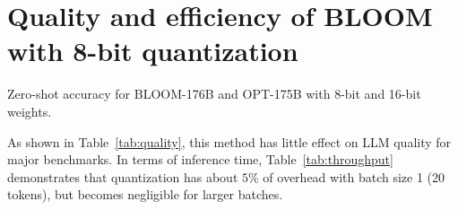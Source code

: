 \section{Quality and efficiency of BLOOM with 8-bit quantization}\label{appendix:8bit_quality}

\begin{table}[b]
\begin{minipage}{0.56\textwidth}
\centering
\caption{Zero-shot accuracy for \mbox{BLOOM-176B} and \mbox{OPT-175B} with 8-bit and 16-bit weights.\nocite{eval-harness}}
\vspace{9pt}
\label{tab:quality}
\end{minipage}
\hspace{4px}
\begin{minipage}{0.42\textwidth}
\centering
\caption{Generation throughput (tokens/s) for BLOOM-176B with 8-bit and 16-bit weights on 8$\times$~A100 GPUs.}
\label{tbl:memory_footprint}
\label{tab:throughput}
\end{minipage}
\end{table}

As shown in Table~\ref{tab:quality}, this method has little effect on LLM quality for major benchmarks.
In terms of inference time, Table~\ref{tab:throughput} demonstrates that quantization has about $5\%$ of overhead with batch size 1 (20 tokens), but becomes negligible for larger batches.


